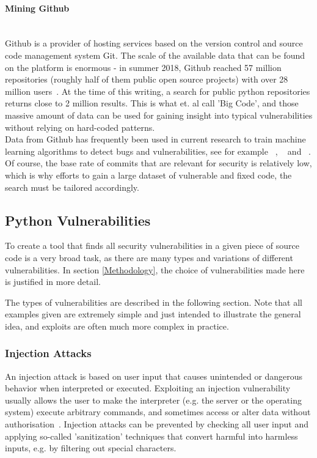\documentclass[
	a4paper,
	pagesize,
	pdftex,
	12pt,
	twoside, %
	BCOR=5mm, %
	ngerman,
	fleqn,
	final,
	]{scrartcl}
\begin{document}
\paragraph{Mining Github}\mbox{}\\
Github is a provider of hosting services based on the version control and source code management system Git. The scale of the available data that can be found on the platform is enormous - in summer 2018, Github reached 57 million repositories (roughly half of them public open source projects) with over 28 million users~\cite{Github.com.b}. At the time of this writing, a search for public python repositories returns close to 2 million results. This is what \cite{Allamanis.2018} et. al call 'Big Code', and those massive amount of data can be used for gaining insight into typical vulnerabilities without relying on hard-coded patterns.\\
Data from Github has frequently been used in current research to train machine learning algorithms to detect bugs and vulnerabilities, see for example ~\cite{Zhou.2017}, ~\cite{Russell.2018} and ~\cite{Liu.2018}. Of course, the base rate of commits that are relevant for security is relatively low, which is why efforts to gain a large dataset of vulnerable and fixed code, the search must be tailored accordingly.\\ 


\subsection{Python Vulnerabilities}

To create a tool that finds all security vulnerabilities in a given piece of source code is a very broad task, as there are many types and variations of different vulnerabilities. In section \ref{Methodology}, the choice of vulnerabilities made here is justified in more detail. 

The types of vulnerabilities are described in the following section. Note that all examples given are extremely simple and just intended to illustrate the general idea, and exploits are often much more complex in practice.

\subsubsection{Injection Attacks}
An injection attack is based on user input that causes unintended or dangerous behavior when interpreted or executed. Exploiting an injection vulnerability usually allows the user to make the interpreter (e.g. the server or the operating system) execute arbitrary commands, and sometimes access or alter data without authorisation~\cite{Micheelsen.2016}. Injection attacks can be prevented by checking all user input and applying so-called 'sanitization' techniques that convert harmful into harmless inputs, e.g. by filtering out special characters. 
\end{document}
